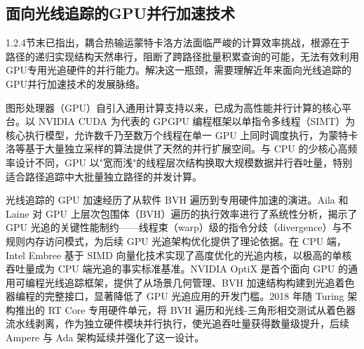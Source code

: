 \subsection{面向光线追踪的GPU并行加速技术}

1.2.4节末已指出，耦合热输运蒙特卡洛方法面临严峻的计算效率挑战，根源在于路径的递归实现结构天然串行，阻断了跨路径批量积累查询的可能，无法有效利用GPU专用光追硬件的并行能力。解决这一瓶颈，需要理解近年来面向光线追踪的GPU并行加速技术的发展脉络。

图形处理器（GPU）自引入通用计算支持以来，已成为高性能并行计算的核心平台。以 NVIDIA CUDA 为代表的 GPGPU 编程框架以单指令多线程（SIMT）为核心执行模型，允许数千乃至数万个线程在单一 GPU 上同时调度执行，为蒙特卡洛等基于大量独立采样的算法提供了天然的并行扩展空间。与 CPU 的少核心高频率设计不同，GPU 以"宽而浅"的线程层次结构换取大规模数据并行吞吐量，特别适合路径追踪中大批量独立路径的并发计算。

光线追踪的 GPU 加速经历了从软件 BVH 遍历到专用硬件加速的演进。Aila 和 Laine 对 GPU 上层次包围体（BVH）遍历的执行效率进行了系统性分析，揭示了 GPU 光追的关键性能制约——线程束（warp）级的指令分歧（divergence）与不规则内存访问模式，为后续 GPU 光追架构优化提供了理论依据\cite{ailaUnderstandingEfficiencyRay2009}。在 CPU 端，Intel Embree 基于 SIMD 向量化技术实现了高度优化的光追内核，以极高的单核吞吐量成为 CPU 端光追的事实标准基准\cite{EmbreeRayTracing,waldEmbreeKernelFramework2014}。NVIDIA OptiX 是首个面向 GPU 的通用可编程光线追踪框架，提供了从场景几何管理、BVH 加速结构构建到光追着色器编程的完整接口，显著降低了 GPU 光追应用的开发门槛\cite{parkerOptiXGeneralPurpose2010}。2018 年随 Turing 架构推出的 RT Core 专用硬件单元，将 BVH 遍历和光线-三角形相交测试从着色器流水线剥离，作为独立硬件模块并行执行，使光追吞吐量获得数量级提升，后续 Ampere 与 Ada 架构延续并强化了这一设计。

